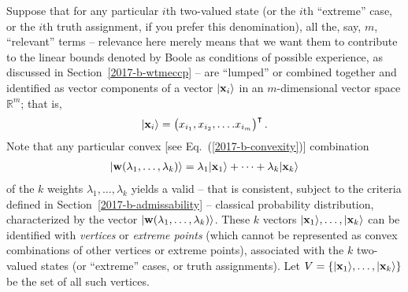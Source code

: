 Suppose  that for any particular $i$th two-valued state
(or the $i$th ``extreme'' case, or the $i$th truth assignment, if you prefer this denomination),
all the, say, $m$, ``relevant'' terms
--
relevance here merely means that we want them to contribute to the linear bounds
denoted by Boole as conditions of possible experience, as discussed in Section~\ref{2017-b-wtmeccp} -- are ``lumped'' or combined together
and identified as vector components of a vector $\vert {\bf x}_i\rangle $
in an $m$-dimensional vector space $\mathbb{R}^m$; that is,
\begin{equation}
\begin{split}
\vert {\bf x}_i\rangle
=
\begin{pmatrix}
x_{i_1},
x_{i_2},
\ldots .
x_{i_m}
\end{pmatrix}^\intercal
.
\label{2017-b-vivector}
\end{split}
\end{equation}
Note that any particular convex [see Eq.~(\ref{2017-b-convexity})] combination
\begin{equation}
\begin{split}
\vert {\bf w} ( \lambda_1 ,\ldots , \lambda_k ) \rangle
=
\lambda_1 \vert  {\bf x}_1 \rangle  + \cdots + \lambda_k \vert  {\bf x}_k \rangle
\label{2017-b-cow}
\end{split}
\end{equation}
of the $k$ weights $\lambda_1, \ldots ,\lambda_k$
yields a valid -- that is consistent, subject to the criteria defined in Section~\ref{2017-b-admissability} --
classical probability distribution, characterized by the vector $\vert {\bf w} ( \lambda_1 ,\ldots , \lambda_k ) \rangle  $.
These $k$ vectors
$\vert  {\bf x}_1 \rangle , \ldots , \vert  {\bf x}_k \rangle$
can be identified with
{\em vertices} or {\em extreme points}
(which cannot be represented as convex combinations of other vertices  or   extreme points),
 associated with the $k$ two-valued states  (or ``extreme'' cases, or truth assignments).
Let
$
V
=
\left\{
\vert  {\bf x}_1 \rangle , \ldots , \vert  {\bf x}_k \rangle
\right\}
$
be the set of all such vertices.

